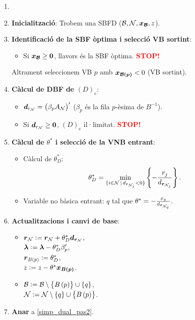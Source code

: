 \begin{alg}
    \begin{enumerate}
        \item[]
        \item {\bf Inicialització}: Trobem una SBFD ($\mathcal{B}, \mathcal{N}, \boldsymbol{x_{\mathcal{B}}}, z$).
        \item \label{simp_dual_pas2} {\bf Identificació de la SBF òptima i selecció VB sortint}:
            \begin{itemize}
                \item Si $\boldsymbol{x_{\mathcal{B}}} \geq \boldsymbol{0}$, llavors és la SBF òptima. \textcolor{red}{\bf STOP!}
            \end{itemize}
            Altrament seleccionem VB $p$ amb $\boldsymbol{x_{\mathcal{B}\left(p\right)}} < 0$ (VB sortint).
        \item {\bf Càlcul de DBF de $\left(D\right)_e$}:
            \begin{itemize}
                \item $\boldsymbol{d}_{r_{\mathcal{N}}} = \left(\beta_p A_{\mathcal{N}}\right)^\prime$ ($\beta_p$ és la fila $p$-èsima de $B^{-1}$).
                \item Si $\boldsymbol{d}_{r_{\mathcal{N}}} \geq \boldsymbol{0}$, $\left(D\right)_e$ il·limitat. \textcolor{red}{\bf STOP!}
            \end{itemize}
        \item {\bf Càlcul de $\theta^*$ i selecció de la VNB entrant}:
            \begin{itemize}
                \item Càlcul de $\theta_D^*$: 
                    \[\theta_D^* = \min_{\{i \in \mathcal{N} \,|\, d_{\boldsymbol{r}_{\mathcal{N}_j}} < 0\}} \left\{-\frac{r_j}{d_{\boldsymbol{r}_{\mathcal{N}_j}}} \right\}.\]
                \item Variable no bàsica entrant: $q$ tal que $\theta^* = -\frac{x_q}{d_{\boldsymbol{r}_{\mathcal{N}_q}}}$.
            \end{itemize}
        \item {\bf Actualitzacions i canvi de base}:
            \begin{itemize}
                \item $\boldsymbol{r}_{\mathcal{N}} := \boldsymbol{r}_{\mathcal{N}} + \theta_D^* \boldsymbol{d}_{\boldsymbol{r}_{\mathcal{N}}}$, \\
                    $\boldsymbol{\lambda} := \boldsymbol{\lambda} - \theta_D^* \beta_p^\prime$, \\
                    $\boldsymbol{r}_{B\left(p\right)} := \theta_D^*$, \\
                    $z := z - \theta^* \boldsymbol{x_{B\left(p\right)}}$.
                \item $\mathcal{B} := \mathcal{B} \setminus \left\{B\left(p\right)\right\} \cup \left\{q\right\}$, \\
                    $\mathcal{N} := \mathcal{N} \setminus \left\{q\right\} \cup \left\{B\left(p\right)\right\}$.
            \end{itemize}
        \item {\bf Anar} a \ref{simp_dual_pas2}.
    \end{enumerate}
\end{alg}

